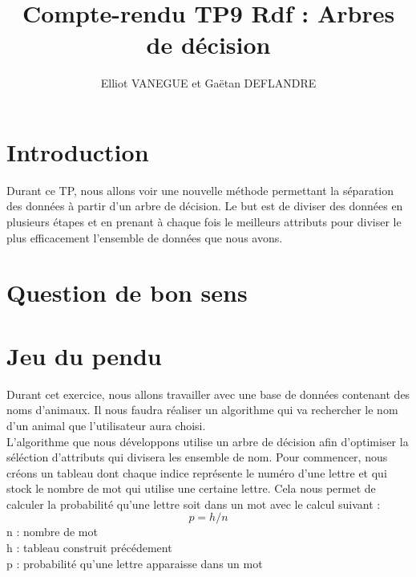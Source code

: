 \documentclass[a4paper,11pt]{article}
\title{Compte-rendu TP9 Rdf : Arbres de décision}
\author{Elliot VANEGUE et Gaëtan DEFLANDRE}
\begin{document}
  
  
  
  \maketitle
  
  \mbox{}
  \newpage
  \clearpage
  
  \section*{Introduction}
   Durant ce TP, nous allons voir une nouvelle méthode permettant la séparation des données à partir
   d'un arbre de décision. Le but est de diviser des données en plusieurs étapes et en prenant à chaque fois
   le meilleurs attributs pour diviser le plus efficacement l'ensemble de données que nous avons.

  \section{Question de bon sens}
  
  \section{Jeu du pendu}
  Durant cet exercice, nous allons travailler avec une base de données contenant des noms d'animaux. Il nous
  faudra réaliser un algorithme qui va rechercher le nom d'un animal que l'utilisateur aura choisi.\\
  
  L'algorithme que nous développons utilise un arbre de décision afin d'optimiser la séléction d'attributs qui
  divisera les ensemble de nom. Pour commencer, nous créons un tableau dont chaque indice représente le numéro
  d'une lettre et qui stock le nombre de mot qui utilise une certaine lettre. Cela nous permet de calculer
  la probabilité qu'une lettre soit dans un mot avec le calcul suivant :
  $$ p = h / n $$
  n : nombre de mot\\
  h : tableau construit précédement\\
  p : probabilité qu'une lettre apparaisse dans un mot\\
  
\end{document}
